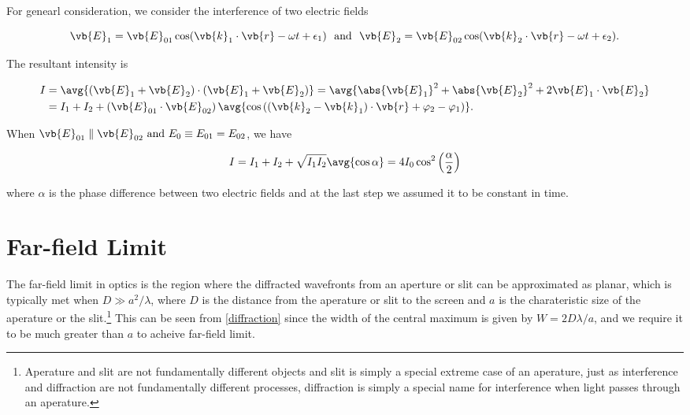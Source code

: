 \documentclass[english,a4paper,12pt]{report}
\begin{document}
For genearl consideration, we consider the interference of two electric fields 

\begin{equation}
    \vb{E} _{1} = \vb{E} _{01} \cos (\vb{k}_{1}  \cdot \vb{r} - \omega t + \epsilon _{1} ) ~\text { and }~ \vb{E} _{2} = \vb{E} _{02} \cos (\vb{k}_{2}  \cdot \vb{r} - \omega t + \epsilon _{2} ).    
\end{equation}

The resultant intensity is 

\begin{equation}
    \begin{aligned} 
    I &= \avg{(\vb{E} _{1} + \vb{E} _{2}  ) \cdot (\vb{E} _{1} + \vb{E} _{2}  )} = \avg{\abs{\vb{E} _{1} }^2 + \abs{\vb{E} _{2} }^2 + 2 \vb{E} _{1} \cdot \vb{E} _{2}    } \\ &= I_1 + I_2 + \left( \vb{E} _{01} \cdot \vb{E} _{02}   \right) \avg{\cos \left( \left( \vb{k} _{2} - \vb{k} _{1}   \right) \cdot \vb{r} + \varphi _{2} - \varphi _{1}   \right)}.
    \end{aligned} 
\end{equation}

When \(\vb{E} _{01} \parallel \vb{E} _{02} \text { and } E_0  \equiv E_{01} = E_{02}    \), we have

\begin{equation}
    I = I_1 + I_2 + \sqrt{I_1 I_2 }  \avg{\cos \alpha} = 4I_0 \cos ^2 \left( \frac{\alpha }{2}  \right) 
\end{equation}

where \(\alpha \) is the phase difference between two electric fields and at the last step we assumed it to be constant in time.

\section{Far-field Limit}

The far-field limit in optics is the region where the diffracted wavefronts from an aperture or slit can be approximated as planar, which is typically met when \(D \gg a^2/\lambda \), where \(D\) is the distance from the aperature or slit to the screen and \(a\) is the charateristic size of the aperature or the slit.\footnote{Aperature and slit are not fundamentally different objects and slit is simply a special extreme case of an aperature, just as interference and diffraction are not fundamentally different processes, diffraction is simply a special name for interference when light passes through an aperature.} This can be seen from \cref{diffraction} since the width of the central maximum is given by \(W = 2D\lambda /a\), and we require it to be much greater than \(a\) to acheive far-field limit. 
\end{document}
